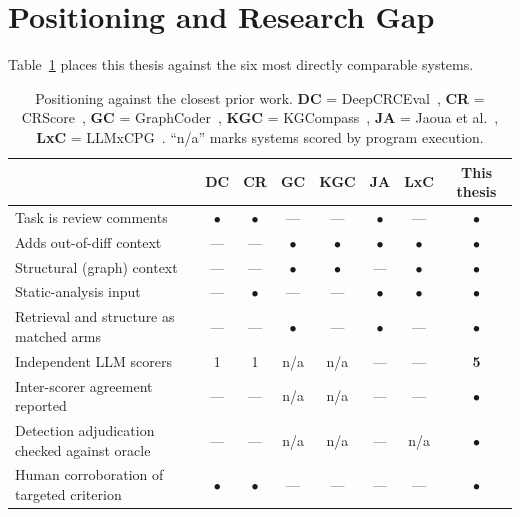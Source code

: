 \section{Positioning and Research Gap}
\label{sec:bg-positioning}

Table~\ref{tab:rw-positioning} places this thesis against the six most
directly comparable systems.

\begin{table}[htbp]
    \centering
    \caption{Positioning against the closest prior work. \textbf{DC} =
             DeepCRCEval~\cite{hong2024deepcrceval}, \textbf{CR} =
             CRScore~\cite{naik2025crscore}, \textbf{GC} =
             GraphCoder~\cite{liu2024graphcoder}, \textbf{KGC} =
             KGCompass~\cite{yang2025kgcompass}, \textbf{JA} =
             Jaoua et al.~\cite{jaoua2025combining}, \textbf{LxC} =
             LLMxCPG~\cite{lekssays2025llmxcpg}. ``n/a'' marks systems scored by
             program execution.}
    \label{tab:rw-positioning}
    \small
    \begin{tabularx}{\textwidth}{@{}Xccccccc@{}}
        \toprule
          & DC & CR & GC & KGC & JA & LxC & \textbf{This thesis} \\
        \midrule
        Task is review comments
          & $\bullet$ & $\bullet$ & --- & --- & $\bullet$ & --- & $\bullet$ \\
        Adds out-of-diff context
          & --- & --- & $\bullet$ & $\bullet$ & $\bullet$ & $\bullet$ & $\bullet$ \\
        Structural (graph) context
          & --- & --- & $\bullet$ & $\bullet$ & --- & $\bullet$ & $\bullet$ \\
        Static-analysis input
          & --- & $\bullet$ & --- & --- & $\bullet$ & $\bullet$ & $\bullet$ \\
        Retrieval and structure as matched arms
          & --- & --- & $\bullet$ & --- & $\bullet$ & --- & $\bullet$ \\
        Independent LLM scorers
          & 1 & 1 & n/a & n/a & --- & --- & \textbf{5}\footnotemark \\
        Inter-scorer agreement reported
          & --- & --- & n/a & n/a & --- & --- & $\bullet$ \\
        Detection adjudication checked against oracle
          & --- & --- & n/a & n/a & --- & n/a & $\bullet$ \\
        Human corroboration of targeted criterion
          & $\bullet$ & $\bullet$ & --- & --- & --- & --- & $\bullet$ \\
        \bottomrule
    \end{tabularx}
\end{table}

